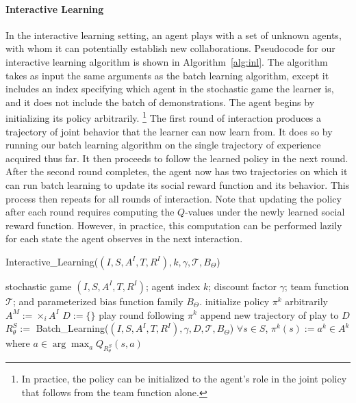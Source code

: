 
\vspace{\up}
\paragraph{Interactive Learning}
\label{sec:interactive}

In the interactive learning setting, an agent plays with a set of
unknown agents, with whom it can potentially establish new
collaborations.  Pseudocode for our interactive learning algorithm is
shown in Algorithm~\ref{alg:inl}. The algorithm takes as input the
same arguments as the batch learning algorithm, except it includes an
index specifying which agent in the stochastic game the learner is,
and it does not include the batch of demonstrations. The agent begins
by initializing its policy arbitrarily.%
\footnote{In practice, the policy can be initialized to the agent's role
in the joint policy that follows from the team function alone.}
%
The first round of interaction produces a trajectory of joint behavior
that the learner can now learn from.  It does so by running our batch
learning algorithm on the single trajectory of experience acquired
thus far.  It then proceeds to follow the learned policy in the next
round.  After the second round completes, the agent now has two
trajectories on which it can run batch learning to update its social
reward function and its behavior.  This process then repeats for all
rounds of interaction.  
%
Note that updating the policy after each round requires computing the
$Q$-values under the newly learned social reward function.  However,
in practice, this computation can be performed lazily for each state
the agent observes in the next interaction.

\begin{algorithm}[t]
\caption{Interactive\_Learning($(I,S,A^I,T,R^I), k, \gamma, {\mathcal T}, B_\Theta$)}
\label{alg:inl}
\begin{algorithmic}
\Require stochastic game $(I,S,A^I,T,R^I)$; agent index $k$; discount factor $\gamma$; team function ${\mathcal T}$; and parameterized bias function family $B_\Theta$.
\State initialize policy $\pi^k$ arbitrarily
\State $A^M := \times_i A^I$ 
\State $D := \{\}$
\State play round following $\pi^k$ %
\State append new trajectory of play to $D$
\State $R^S_\theta :=$ Batch\_Learning($(I,S,A^I,T,R^I), \gamma, D, {\mathcal T}, B_\Theta$)
\State $\forall s \in S$, $\pi^k(s) := a^k \in A^k$ where $a \in \arg \max_a Q_{R^S_\theta}(s, a)$
\EndFor 
\end{algorithmic}
\end{algorithm}
